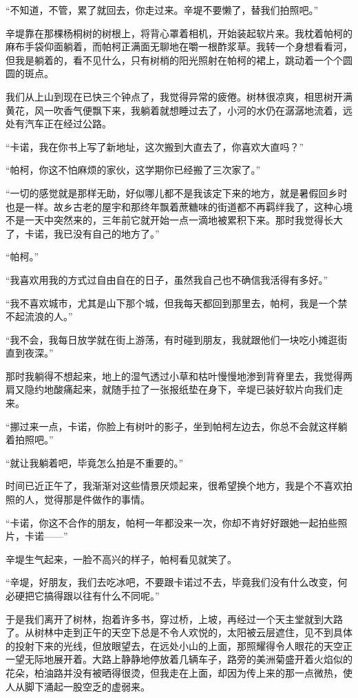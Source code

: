 \par “不知道，不管，累了就回去，你走过来。辛堤不要懒了，替我们拍照吧。”
\par 辛堤靠在那棵杨桐树的树根上，将背心罩着相机，开始装起软片来。我枕着帕柯的麻布手袋仰面躺着，而帕柯正满面无聊地在嚼一根酢浆草。我转一个身想看看河，但我是躺着的，看不见什么，只有树梢的阳光照射在帕柯的裙上，跳动着一个个圆圆的斑点。
\par 我们从上山到现在已快三个钟点了，我觉得异常的疲倦。树林很凉爽，相思树开满黄花，风一吹香气便飘下来，我躺着就想睡过去了，小河的水仍在潺潺地流着，远处有汽车正在经过公路。
\par “卡诺，我在你书上写了新地址，这次搬到大直去了，你喜欢大直吗？”
\par “帕柯，你这不怕麻烦的家伙，这学期你已经搬了三次家了。”
\par “一切的感觉就是那样无助，好似哪儿都不是我该定下来的地方，就是暑假回乡时也是一样。故乡古老的屋宇和那终年飘着蔗糖味的街道都不再羁绊我了，这种心境不是一天中突然来的，三年前它就开始一点一滴地被累积下来。那时我觉得长大了，卡诺，我已没有自己的地方了。”
\par “帕柯。”
\par “我喜欢用我的方式过自由自在的日子，虽然我自己也不确信我活得有多好。”
\par “我不喜欢城市，尤其是山下那个城，但我每天都回到那里去，帕柯，我是一个禁不起流浪的人。”
\par “我不会，我每日放学就在街上游荡，有时碰到朋友，我就跟他们一块吃小摊逛街直到夜深。”
\par 那时我躺得不想起来，地上的湿气透过小草和枯叶慢慢地渗到背脊里去，我觉得两肩又隐约地酸痛起来，就随手拉了一张报纸垫在身下，辛堤已装好软片向我们走来。
\par “挪过来一点，卡诺，你脸上有树叶的影子，坐到帕柯左边去，你总不会就这样躺着拍照吧。”
\par “就让我躺着吧，毕竟怎么拍是不重要的。”
\par 时间已近正午了，我渐渐对这些情景厌烦起来，很希望换个地方，我是个不喜欢拍照的人，觉得那是件做作的事情。
\par “卡诺，你这不合作的朋友，帕柯一年都没来一次，你却不肯好好跟她一起拍些照片，卡诺——”
\par 辛堤生气起来，一脸不高兴的样子，帕柯看见就笑了。
\par “辛堤，好朋友，我们去吃冰吧，不要跟卡诺过不去，毕竟我们没有什么改变，何必硬把它搞得跟以往有什么不同呢。”
\par 于是我们离开了树林，抱着许多书，穿过桥，上坡，再经过一个天主堂就到大路了。从树林中走到正午的天空下总是不令人欢悦的，太阳被云层遮住，见不到具体的投射下来的光线，但放眼望去，在远处小山的上面，那照耀得令人眼花的天空正一望无际地展开着。大路上静静地停放着几辆车子，路旁的美洲菊盛开着火焰似的花朵，柏油路并没有被晒得很烫，但我走在上面，却因为传上来的那一点微热，使人从脚下涌起一股空乏的虚弱来。
